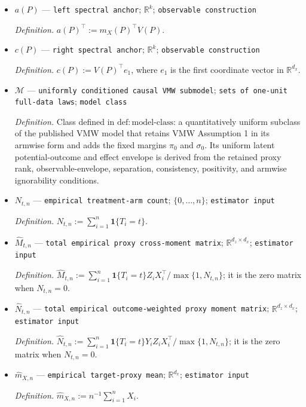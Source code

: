 \documentclass{article}
\begin{document}
\begin{itemize}
  \item \(a(P)\) --- \texttt{left spectral anchor}; \(\mathbb R^k\); \texttt{observable construction}
  \par\smallskip\noindent\emph{Definition.} \(a(P)^\top:=m_X(P)^\top V(P)\).
  \item \(c(P)\) --- \texttt{right spectral anchor}; \(\mathbb R^k\); \texttt{observable construction}
  \par\smallskip\noindent\emph{Definition.} \(c(P):=V(P)^\top e_1\), where \(e_1\) is the first coordinate vector in \(\mathbb R^{d_x}\).
  \item \(\mathcal M\) --- \texttt{uniformly conditioned causal VMW submodel}; \texttt{sets of one-\allowbreak{}unit full-\allowbreak{}data laws}; \texttt{model class}
  \par\smallskip\noindent\emph{Definition.} Class defined in \(\mathrm{def:model\text{-}class}\): a quantitatively uniform subclass of the published VMW model that retains VMW Assumption 1 in its armwise form and adds the fixed margins \(\pi_0\) and \(\sigma_0\).  Its uniform latent potential-outcome and effect envelope is derived from the retained proxy rank, observable-envelope, separation, consistency, positivity, and armwise ignorability conditions.
  \item \(N_{t,n}\) --- \texttt{empirical treatment-\allowbreak{}arm count}; \(\{0,\ldots,n\}\); \texttt{estimator input}
  \par\smallskip\noindent\emph{Definition.} \(N_{t,n}:=\sum_{i=1}^{n}\mathbf 1\{T_i=t\}\).
  \item \(\widehat M_{t,n}\) --- \texttt{total empirical proxy cross-\allowbreak{}moment matrix}; \(\mathbb R^{d_z\times d_x}\); \texttt{estimator input}
  \par\smallskip\noindent\emph{Definition.} \(\widehat M_{t,n}:=\sum_{i=1}^{n}\mathbf 1\{T_i=t\}Z_iX_i^\top/\max\{1,N_{t,n}\}\); it is the zero matrix when \(N_{t,n}=0\).
  \item \(\widehat N_{t,n}\) --- \texttt{total empirical outcome-\allowbreak{}weighted proxy moment matrix}; \(\mathbb R^{d_z\times d_x}\); \texttt{estimator input}
  \par\smallskip\noindent\emph{Definition.} \(\widehat N_{t,n}:=\sum_{i=1}^{n}\mathbf 1\{T_i=t\}Y_iZ_iX_i^\top/\max\{1,N_{t,n}\}\); it is the zero matrix when \(N_{t,n}=0\).
  \item \(\widehat m_{X,n}\) --- \texttt{empirical target-\allowbreak{}proxy mean}; \(\mathbb R^{d_x}\); \texttt{estimator input}
  \par\smallskip\noindent\emph{Definition.} \(\widehat m_{X,n}:=n^{-1}\sum_{i=1}^{n}X_i\).

\end{itemize}
\end{document}
